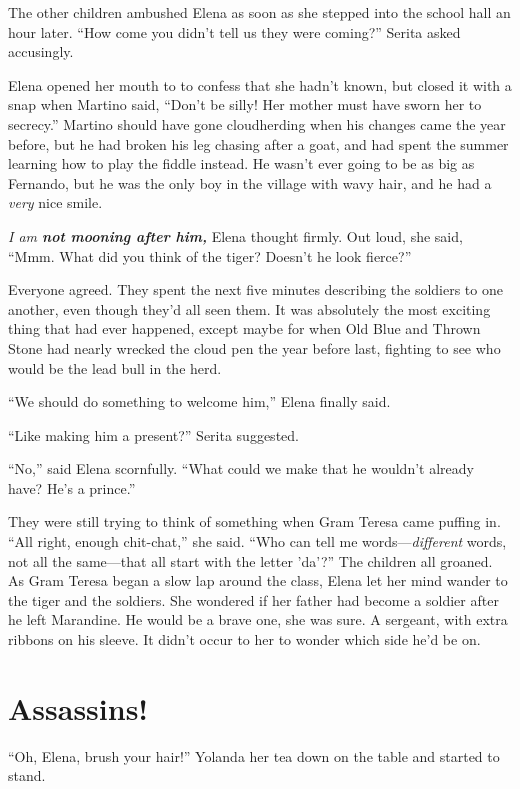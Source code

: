 \documentclass[10pt]{book}
\begin{document}
The other children ambushed Elena as soon as she stepped into the school hall an hour later. ``How come you didn't tell us they were coming?'' Serita asked accusingly.

Elena opened her mouth to to confess that she hadn't known, but closed it with a snap when Martino said, ``Don't be silly! Her mother must have sworn her to secrecy.'' Martino should have gone cloudherding when his changes came the year before, but he had broken his leg chasing after a goat, and had spent the summer learning how to play the fiddle instead. He wasn't ever going to be as big as Fernando, but he was the only boy in the village with wavy hair, and he had a \emph{very} nice smile.

\emph{I am \bf{not} mooning after him,} Elena thought firmly. Out loud, she said, ``Mmm. What did you think of the tiger? Doesn't he look fierce?''

Everyone agreed. They spent the next five minutes describing the soldiers to one another, even though they'd all seen them. It was absolutely the most exciting thing that had ever happened, except maybe for when Old Blue and Thrown Stone had nearly wrecked the cloud pen the year before last, fighting to see who would be the lead bull in the herd.

``We should do something to welcome him,'' Elena finally said.

``Like making him a present?'' Serita suggested.

``No,'' said Elena scornfully. ``What could we make that he wouldn't already have? He's a prince.''

They were still trying to think of something when Gram Teresa came puffing in. ``All right, enough chit-chat,'' she said. ``Who can tell me words---\emph{different} words, not all the same---that all start with the letter 'da'?'' The children all groaned. As Gram Teresa began a slow lap around the class, Elena let her mind wander to the tiger and the soldiers. She wondered if her father had become a soldier after he left Marandine. He would be a brave one, she was sure. A sergeant, with extra ribbons on his sleeve. It didn't occur to her to wonder which side he'd be on.

\chapter{Assassins!}

``Oh, Elena, brush your hair!'' Yolanda her tea down on the table and started to stand.
\end{document}
